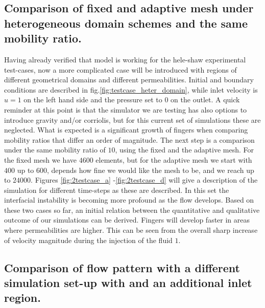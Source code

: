 \documentclass[preprint,authoryear,12pt]{elsarticle}
\begin{document}
\subsection{Comparison of fixed and adaptive mesh under heterogeneous domain schemes and the same mobility ratio.}\label{section:results_hete_fix_adapt}

\medskip
Having already verified that model is working for the hele-shaw experimental test-cases, now a more complicated case will be introduced with regions of different geometrical domains and different permeabilities. Initial and boundary conditions are described in fig.\ref{fig:testcase_heter_domain}, while inlet velocity is $u=1$ on the left hand side and the pressure set to $0$ on the outlet. A quick reminder at this point is that the simulator we are testing has also options to introduce gravity and/or corriolis, but for this current set of simulations these are neglected. What is expected is a significant growth of fingers when comparing mobility ratios that differ an order of magnitude. %
The next step is a comparison under the same mobility ratio of $10$, using the fixed and the adaptive mesh. For the fixed mesh we have $4600$ elements, but for the adaptive mesh we start with $400$ up to $600$, depends how fine we would like the mesh to be, and we reach up to $24000$. %
Figures \ref{fig:2testcase_a}%
-\ref{fig:2testcase_d} will give a description of the simulation for different time-steps as these are described. In this set the interfacial instability is becoming more profound as the flow develops. Based on these two cases so far, an initial relation between the quantitative and qualitative outcome of our simulations can be derived. Fingers will develop faster in areas where permeabilities are higher. This can be seen from the overall sharp increase of velocity magnitude during the injection of the fluid $1$.    


\subsection{Comparison of flow pattern with a different simulation set-up with and an additional inlet region.}\label{section:results_dinlet}
\end{document}
